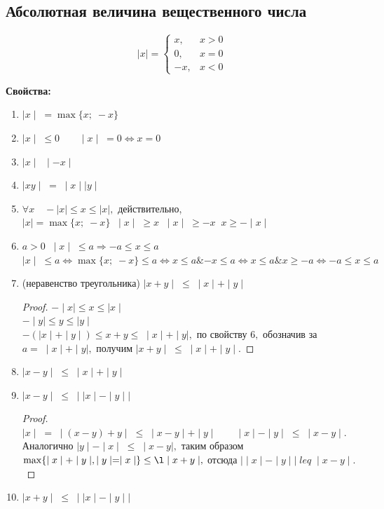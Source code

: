 \subsection{Абсолютная величина вещественного числа}
\begin{Definition}
\begin{equation*}
\mid x\mid = 
 \begin{cases}
   x, & x>0\\
   0, & x=0\\
   -x, & x<0
 \end{cases}
\end{equation*}
\end{Definition}
\par\medskip \textbf{Свойства:}\par
\begin{enumerate}
\item $\mid x\mid \;=\max\{x;\; -x\}$
\item $\mid x\mid\;\leq 0 \qquad \mid x\mid\;=0 \Leftrightarrow x=0$
\item $\mid x\mid \;\;\mid -x\mid$
\item $\mid xy\mid\; =\;\mid x\mid\mid y\mid$
\item $\forall x\quad -\mid x\mid\leq x\leq\mid x\mid,$ действительно, $\mid x\mid=\max\{x;\; -x\} \;\; \mid x\mid\;\geq x\;\;\mid x\mid\;\geq -x\;\; x\geq-\mid x\mid$
\item $a>0 \;\; \mid x\mid\;\leq a \Rightarrow -a\leq x\leq a$\\
$\mid x\mid\;\leq a \Leftrightarrow \max\{x;\; -x\}\leq a \Leftrightarrow x\leq a \mathbin{\&} -x\leq a \Leftrightarrow x\leq a\mathbin{\&} x\geq -a \Leftrightarrow -a\leq x\leq a$
\item (неравенство треугольника) $\mid x+y\mid
\;\leq\;\mid x\mid+\mid y\mid$
\begin{proof}
$-\mid x\mid\leq x\leq\mid x\mid$\\
$-\mid y\mid\leq y\leq\mid y\mid$\\
$-(\mid x\mid+\mid y\mid)\leq x+y\leq\;\mid x\mid+\mid y\mid,$ по свойству $6,$ обозначив за $a=\;\mid x\mid+\mid y\mid,$ получим $\mid x+y\mid\;\leq\;\mid x\mid+\mid y\mid.$
\end{proof}
\item $\mid x-y\mid\;\leq\;\mid x\mid+\mid y\mid$
\item $\mid x-y\mid\;\leq\;\mid\mid x\mid-\mid y\mid\mid$
\begin{proof}
$\mid x\mid\;=\;\mid(x-y)+y\mid\;\leq\;\mid x-y\mid+\mid y\mid \qquad \mid x\mid-\mid y\mid\;\leq\;\mid x-y\mid.$\\
Аналогично $\mid y\mid-\mid x\mid\;\leq\;\mid x-y\mid,$ таким образом $\max\{\mid x\mid+\mid y\mid, \mid y\mid=\mid x\mid\}\leq\l\mid x+y\mid,$ отсюда $\mid\mid x\mid -\mid y\mid\mid\;leq\;\mid x-y\mid.$
\end{proof}
\item $\mid x+y\mid\; \leq\;\mid\mid x\mid-\mid y\mid\mid$
\end{enumerate}

